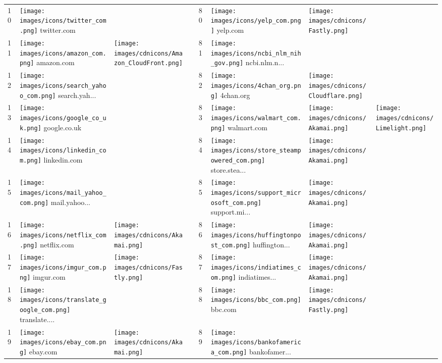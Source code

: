 \begin{table}[tbp]
\begin{tabular}{|llll|llll|}
10 & \texttt{[image: images/icons/twitter\_com.png]} twitter.com & & & 80 & \texttt{[image: images/icons/yelp\_com.png]} yelp.com & \texttt{[image: images/cdnicons/Fastly.png]} & \\
11 & \texttt{[image: images/icons/amazon\_com.png]} amazon.com & \texttt{[image: images/cdnicons/Amazon\_CloudFront.png]} & & 81 & \texttt{[image: images/icons/ncbi\_nlm\_nih\_gov.png]} ncbi.nlm.n... & & \\
12 & \texttt{[image: images/icons/search\_yahoo\_com.png]} search.yah... & & & 82 & \texttt{[image: images/icons/4chan\_org.png]} 4chan.org & \texttt{[image: images/cdnicons/Cloudflare.png]} & \\
13 & \texttt{[image: images/icons/google\_co\_uk.png]} google.co.uk & & & 83 & \texttt{[image: images/icons/walmart\_com.png]} walmart.com & \texttt{[image: images/cdnicons/Akamai.png]} & \texttt{[image: images/cdnicons/Limelight.png]} \\
14 & \texttt{[image: images/icons/linkedin\_com.png]} linkedin.com & & & 84 & \texttt{[image: images/icons/store\_steampowered\_com.png]} store.stea... & \texttt{[image: images/cdnicons/Akamai.png]} & \\
15 & \texttt{[image: images/icons/mail\_yahoo\_com.png]} mail.yahoo... & & & 85 & \texttt{[image: images/icons/support\_microsoft\_com.png]} support.mi... & \texttt{[image: images/cdnicons/Akamai.png]} & \\
16 & \texttt{[image: images/icons/netflix\_com.png]} netflix.com & \texttt{[image: images/cdnicons/Akamai.png]} & & 86 & \texttt{[image: images/icons/huffingtonpost\_com.png]} huffington... & \texttt{[image: images/cdnicons/Akamai.png]} & \\
17 & \texttt{[image: images/icons/imgur\_com.png]} imgur.com & \texttt{[image: images/cdnicons/Fastly.png]} & & 87 & \texttt{[image: images/icons/indiatimes\_com.png]} indiatimes... & \texttt{[image: images/cdnicons/Akamai.png]} & \\
18 & \texttt{[image: images/icons/translate\_google\_com.png]} translate.... & & & 88 & \texttt{[image: images/icons/bbc\_com.png]} bbc.com & \texttt{[image: images/cdnicons/Fastly.png]} & \\
19 & \texttt{[image: images/icons/ebay\_com.png]} ebay.com & \texttt{[image: images/cdnicons/Akamai.png]} & & 89 & \texttt{[image: images/icons/bankofamerica\_com.png]} bankofamer... & & \\

\end{tabular}
\end{table}
